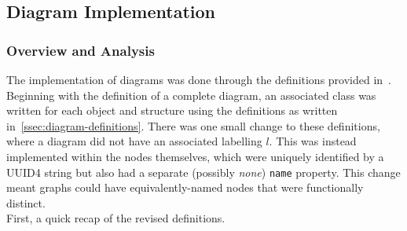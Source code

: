 \subsection{Diagram Implementation}

    \subsubsection{Overview and Analysis}\label{sssec:diagram-implementation-analysis}
        The implementation of diagrams was done through the definitions provided in~\cite{solo-diagrams}.
        Beginning with the definition of a complete diagram, an associated class was written for each object and structure using the definitions as written in~\ref{ssec:diagram-definitions}.
        There was one small change to these definitions, where a diagram did not have an associated labelling $l$.
        This was instead implemented within the nodes themselves, which were uniquely identified by a UUID4 string but also had a separate (possibly \textit{none}) \texttt{name} property.
        This change meant graphs could have equivalently-named nodes that were functionally distinct. \\

        First, a quick recap of the revised definitions.

